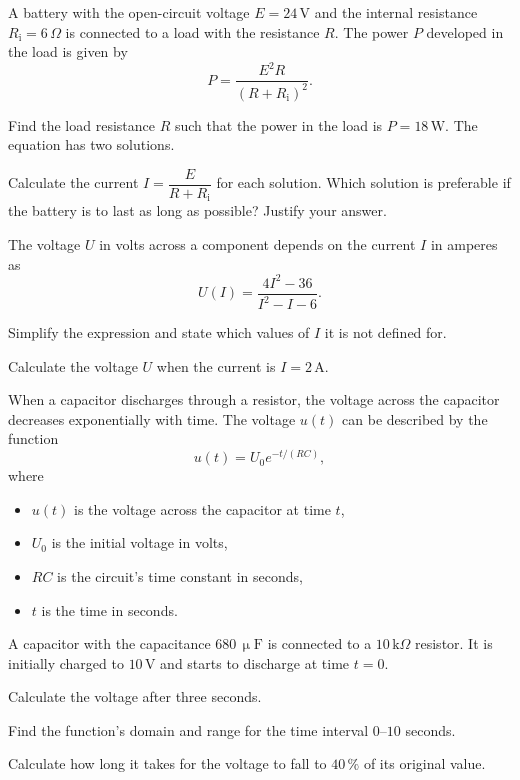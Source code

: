 A battery with the open-circuit voltage $E = 24\,\text{V}$ and the internal resistance
$R_{\text{i}} = 6\,\Omega$ is connected to a load with the resistance $R$. The power $P$
developed in the load is given by
\[
  P = \frac{E^2 R}{(R + R_{\text{i}})^2}.
\]
\begin{parts}
  \item Find the load resistance $R$ such that the power in the load is $P = 18\,\text{W}$. The
    equation has two solutions.
  \item Calculate the current $I = \dfrac{E}{R + R_{\text{i}}}$ for each solution. Which solution
    is preferable if the battery is to last as long as possible? Justify your answer.
\end{parts}

The voltage $U$ in volts across a component depends on the current $I$ in amperes as
\[
  U(I) = \frac{4I^2 - 36}{I^2 - I - 6}.
\]
\begin{parts}
  \item Simplify the expression and state which values of $I$ it is not defined for.
  \item Calculate the voltage $U$ when the current is $I = 2\,\text{A}$.
\end{parts}

When a capacitor discharges through a resistor, the voltage across the capacitor decreases
exponentially with time. The voltage $u(t)$ can be described by the function
\[
  u(t) = U_0 e^{-t/(RC)},
\]
where
\begin{itemize}
  \item $u(t)$ is the voltage across the capacitor at time $t$,
  \item $U_0$ is the initial voltage in volts,
  \item $RC$ is the circuit's time constant in seconds,
  \item $t$ is the time in seconds.
\end{itemize}
A capacitor with the capacitance $680\,\upmu\text{F}$ is connected to a $10\,\text{k}\Omega$
resistor. It is initially charged to $10\,\text{V}$ and starts to discharge at time $t = 0$.
\begin{parts}
  \item Calculate the voltage after three seconds.
  \item Find the function's domain and range for the time interval $0$--$10$ seconds.
  \item Calculate how long it takes for the voltage to fall to $40\,\%$ of its original value.
\end{parts}

